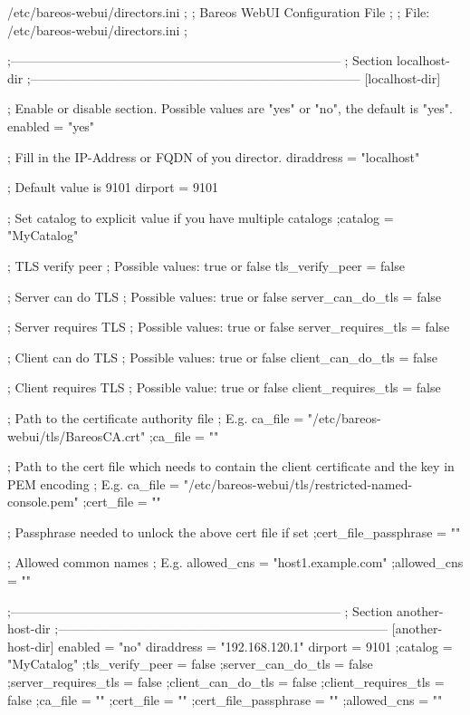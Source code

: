 \begin{bconfig}{/etc/bareos-webui/directors.ini}
;
; Bareos WebUI Configuration File
;
; File: /etc/bareos-webui/directors.ini
;

;------------------------------------------------------------------------------
; Section localhost-dir
;------------------------------------------------------------------------------
[localhost-dir]

; Enable or disable section. Possible values are "yes" or "no", the default is "yes".
enabled = "yes"

; Fill in the IP-Address or FQDN of you director.
diraddress = "localhost"

; Default value is 9101
dirport	= 9101

; Set catalog to explicit value if you have multiple catalogs
;catalog = "MyCatalog"

; TLS verify peer
; Possible values: true or false
tls_verify_peer = false

; Server can do TLS
; Possible values: true or false
server_can_do_tls = false

; Server requires TLS
; Possible values: true or false
server_requires_tls = false

; Client can do TLS
; Possible values: true or false
client_can_do_tls = false

; Client requires TLS
; Possible value: true or false
client_requires_tls = false

; Path to the certificate authority file
; E.g. ca_file = "/etc/bareos-webui/tls/BareosCA.crt"
;ca_file = ""

; Path to the cert file which needs to contain the client certificate and the key in PEM encoding
; E.g. ca_file = "/etc/bareos-webui/tls/restricted-named-console.pem"
;cert_file = ""

; Passphrase needed to unlock the above cert file if set
;cert_file_passphrase = ""

; Allowed common names
; E.g. allowed_cns = "host1.example.com"
;allowed_cns = ""

;------------------------------------------------------------------------------
; Section another-host-dir
;------------------------------------------------------------------------------
[another-host-dir]
enabled = "no"
diraddress = "192.168.120.1"
dirport = 9101
;catalog = "MyCatalog"
;tls_verify_peer = false
;server_can_do_tls = false
;server_requires_tls = false
;client_can_do_tls = false
;client_requires_tls = false
;ca_file = ""
;cert_file = ""
;cert_file_passphrase = ""
;allowed_cns = ""

\end{bconfig}

